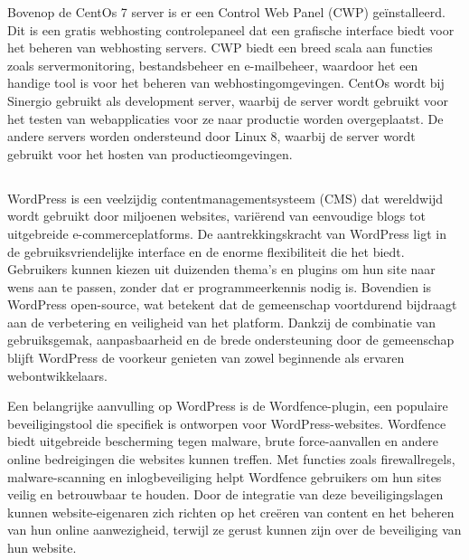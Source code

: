 Bovenop de CentOs 7 server is er een Control Web Panel (CWP) geïnstalleerd. Dit is een gratis webhosting controlepaneel dat
een grafische interface biedt voor het beheren van webhosting servers. CWP biedt een breed scala aan functies zoals
servermonitoring, bestandsbeheer en e-mailbeheer, waardoor het een handige tool is voor het beheren van webhostingomgevingen.
CentOs wordt bij Sinergio gebruikt als development server, waarbij de server wordt gebruikt voor het testen van webapplicaties 
voor ze naar productie worden overgeplaatst. De andere servers worden ondersteund door Linux 8, waarbij de server wordt 
gebruikt voor het hosten van productieomgevingen.

\subsection{}
WordPress is een veelzijdig contentmanagementsysteem (CMS) dat wereldwijd wordt gebruikt door miljoenen websites, variërend van 
eenvoudige blogs tot uitgebreide e-commerceplatforms. De aantrekkingskracht van WordPress ligt in de gebruiksvriendelijke 
interface en de enorme flexibiliteit die het biedt. Gebruikers kunnen kiezen uit duizenden thema's en plugins om hun site 
naar wens aan te passen, zonder dat er programmeerkennis nodig is. Bovendien is WordPress open-source, wat betekent dat de 
gemeenschap voortdurend bijdraagt aan de verbetering en veiligheid van het platform. Dankzij de combinatie van gebruiksgemak, 
aanpasbaarheid en de brede ondersteuning door de gemeenschap blijft WordPress de voorkeur genieten van zowel beginnende als 
ervaren webontwikkelaars.

Een belangrijke aanvulling op WordPress is de Wordfence-plugin, een populaire beveiligingstool die specifiek is ontworpen 
voor WordPress-websites. Wordfence biedt uitgebreide bescherming tegen malware, brute force-aanvallen en andere online 
bedreigingen die websites kunnen treffen. Met functies zoals firewallregels, malware-scanning en inlogbeveiliging helpt 
Wordfence gebruikers om hun sites veilig en betrouwbaar te houden. Door de integratie van deze beveiligingslagen kunnen 
website-eigenaren zich richten op het creëren van content en het beheren van hun online aanwezigheid, terwijl ze gerust 
kunnen zijn over de beveiliging van hun website.

